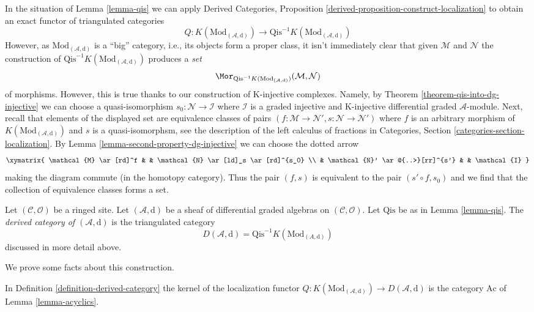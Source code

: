 \noindent
In the situation of Lemma \ref{lemma-qis} we can apply
Derived Categories, Proposition
\ref{derived-proposition-construct-localization}
to obtain an exact functor of triangulated categories
$$
Q :
K(\text{Mod}_{(\mathcal{A}, \text{d})})
\longrightarrow
\text{Qis}^{-1}K(\text{Mod}_{(\mathcal{A}, \text{d})})
$$
However, as $\text{Mod}_{(\mathcal{A}, \text{d})}$ is a ``big''
category, i.e., its objects form a proper class, it isn't immediately
clear that given $\mathcal{M}$ and $\mathcal{N}$ the construction
of $\text{Qis}^{-1}K(\text{Mod}_{(\mathcal{A}, \text{d})})$
produces a {\it set}
$$
\Mor_{\text{Qis}^{-1}K(\text{Mod}_{(\mathcal{A}, \text{d})})}
(\mathcal{M}, \mathcal{N})
$$
of morphisms. However, this is true thanks to our construction of
K-injective complexes. Namely, by Theorem \ref{theorem-qis-into-dg-injective}
we can choose a quasi-isomorphism $s_0 : \mathcal{N} \to \mathcal{I}$ where
$\mathcal{I}$ is a graded injective and K-injective
differential graded $\mathcal{A}$-module. Next, recall that elements of
the displayed set are equivalence classes of pairs
$(f : \mathcal{M} \to \mathcal{N}', s : \mathcal{N} \to \mathcal{N}')$
where $f$ is an arbitrary morphism of
$K(\text{Mod}_{(\mathcal{A}, \text{d})})$ and $s$ is a quasi-isomorphsm, see
the description of the left calculus of fractions in
Categories, Section \ref{categories-section-localization}.
By Lemma \ref{lemma-second-property-dg-injective}
we can choose the dotted arrow
$$
\xymatrix{
\mathcal{M} \ar[rd]^f & &
\mathcal{N} \ar[ld]_s \ar[rd]^{s_0} \\
& \mathcal{N}' \ar@{..>}[rr]^{s'} & & \mathcal{I}
}
$$
making the diagram commute (in the homotopy category).
Thus the pair $(f, s)$ is equivalent to the pair $(s' \circ f, s_0)$
and we find that the collection of equivalence classes forms a set.

\begin{definition}
\label{definition-derived-category}
Let $(\mathcal{C}, \mathcal{O})$ be a ringed site. Let
$(\mathcal{A}, \text{d})$ be a sheaf of differential graded algebras
on $(\mathcal{C}, \mathcal{O})$. Let $\text{Qis}$ be as in
Lemma \ref{lemma-qis}. The
{\it derived category of $(\mathcal{A}, \text{d})$} is the triangulated
category
$$
D(\mathcal{A}, \text{d}) = \text{Qis}^{-1}K(\text{Mod}_{(A, \text{d})})
$$
discussed in more detail above.
\end{definition}

\noindent
We prove some facts about this construction.

\begin{lemma}
\label{lemma-kernel-localization}
In Definition \ref{definition-derived-category}
the kernel of the localization functor
$Q : K(\text{Mod}_{(\mathcal{A}, \text{d})}) \to D(\mathcal{A}, \text{d})$
is the category $\text{Ac}$ of Lemma \ref{lemma-acyclics}.
\end{lemma}

